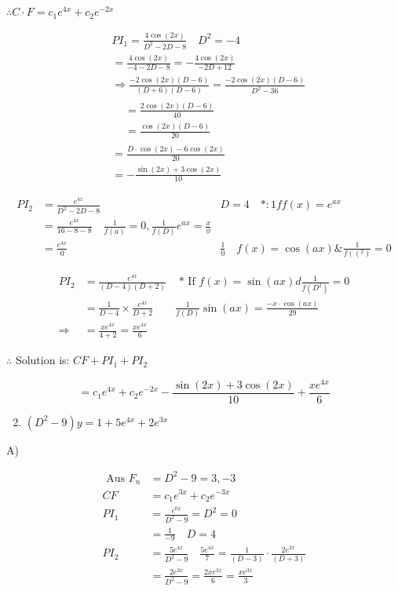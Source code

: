 \documentclass[12pt, a4paper]{article}
\begin{document}
$\therefore C \cdot F=c_{1} e^{4 x}+c_{2} e^{-2 x}$

$$
\begin{aligned}
& P I_{1}=\frac{4 \cos (2 x)}{D^{2}-2 D-8} \quad D^{2}=-4 \\
& =\frac{4 \cos (2 x)}{-4-2 D-8}=-\frac{4 \cos (2 x)}{-2 D+12} \\
& \Rightarrow \frac{-2 \cos (2 x)(D-6)}{(D+6)(D-6)}=\frac{-2 \cos (2 x)(D-6)}{D^{2}-36} \\
& \begin{aligned}
& =\frac{2 \cos (2 x)(D-6)}{40} \\
& =\frac{\cos (2 x)(D-6)}{20}
\end{aligned} \\
& =\frac{D \cdot \cos (2 x)-6 \cos (2 x)}{20} \\
& =-\frac{\sin (2 x)+3 \cos (2 x)}{10}
\end{aligned}
$$

$$
\begin{array}{rlrl}
P I_{2} & =\frac{e^{4 x}}{D^{2}-2 D-8} & D=4 \quad *: 1 f f(x)=e^{a x} \\
& =\frac{e^{4 x}}{16-8-8} \quad \frac{1}{f(a)}=0, \frac{1}{f(D)} e^{a x}=\frac{x}{\phi} \\
& =\frac{e^{4 x}}{0} & \frac{1}{0} \quad f(x)=\cos (a x) \& \frac{1}{f\left(\left(^{2}\right)\right.}=0
\end{array}
$$

$$
\begin{array}{rlrl}
P I_{2} & =\frac{e^{4 x}}{(D-4)(D+2)} & \text { * If } f(x)=\sin (a x) d \frac{1}{f\left(D^{2}\right)}=0 \\
& =\frac{1}{D-4} \times \frac{e^{4 x}}{D+2} & \frac{1}{f(D)} \sin (a x)=\frac{-x \cdot \cos (a x)}{29} \\
\Rightarrow & =\frac{x e^{4 x}}{4+2}=\frac{x e^{4 x}}{6}
\end{array}
$$

$\therefore$ Solution is: $C F+P I_{1}+P I_{2}$

$$
=c_{1} e^{4 x}+c_{2} e^{-2 x}-\frac{\sin (2 x)+3 \cos (2 x)}{10}+\frac{x e^{4 x}}{6}
$$

\begin{enumerate}
  \setcounter{enumi}{1}
  \item $\left(D^{2}-9\right) y=1+5 e^{4 x}+2 e^{3 x}$
\end{enumerate}

A)

$$
\begin{aligned}
\text { Aus } F_{n} & =D^{2}-9=3,-3 \\
C F & =c_{1} e^{3 x}+c_{2} e^{-3 x} \\
P I_{1} & =\frac{e^{0 x}}{D^{2}-9}=D^{2}=0 \\
& =\frac{1}{-9} \quad D=4 \\
P I_{2} & =\frac{5 e^{4 x}}{D^{2}-9} \quad \frac{5 e^{4 x}}{7}=\frac{1}{(D-3)} \cdot \frac{2 e^{3 x}}{(D+3)} \\
& =\frac{2 e^{3 x}}{D^{2}-9}=\frac{2 x e^{3 x}}{6}=\frac{x e^{3 x}}{3}
\end{aligned}
$$
\end{document}
